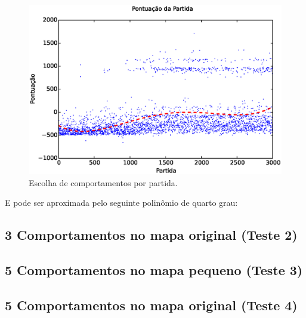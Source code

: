 \begin{figure}[H]
    \centering
    \includegraphics[width=170mm]{images/3_behaviors_small_map/match_scores____pol}
    \caption{\label{img:3ComportamentosMapaPequeno:PontuacaoPorPartida}Escolha de comportamentos por partida.}
\end{figure}

E pode ser aproximada pelo seguinte polinômio de quarto grau:


\subsection{3 Comportamentos no mapa original (Teste 2)}
\subsection{5 Comportamentos no mapa pequeno (Teste 3)}
\subsection{5 Comportamentos no mapa original (Teste 4)}
